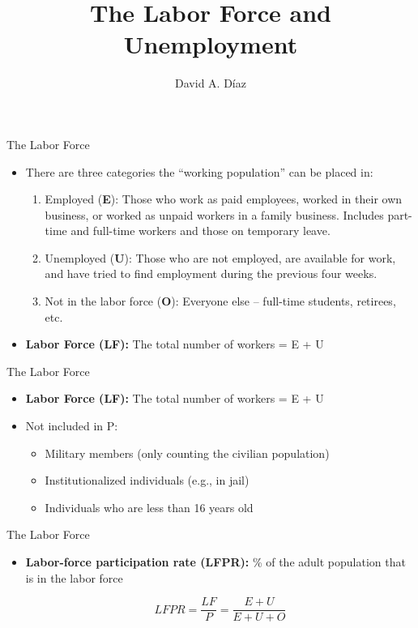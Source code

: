 \documentclass[xcolor={dvipsnames},pdf, hyperref={colorlinks=true, citecolor=ForestGreen, linkcolor=BlueViolet, urlcolor=Magenta}]{beamer}
\title{The Labor Force and Unemployment}
\author{David A. D\'iaz}
\institute{UNC Chapel Hill}
\date{}
\theoremstyle{definition}
\newcommand{\defn}[1]{\textbf{#1}}
\begin{document}
 
	
	\begin{frame}
		
		\titlepage
		
	\end{frame}


\begin{frame}{The Labor Force}
	\begin{itemize}
	\item There are three categories the ``working population'' can be placed in:
	
	\begin{enumerate}
		\item Employed (\textbf{E}): Those who work as paid employees, worked in their own business, or worked as unpaid workers in a family business. Includes part-time and full-time workers and those on temporary leave.
		\item Unemployed (\textbf{U}): Those who are not employed, are available for work, and have tried to find employment during the previous four weeks.
		\item Not in the labor force (\textbf{O}): Everyone else -- full-time students, retirees, etc.
	\end{enumerate}
	
	\item \defn{Labor Force (LF):} The total number of workers = E + U
	


\end{itemize}
\end{frame}

\begin{frame}{The Labor Force}
\begin{itemize}


	\item \defn{Labor Force (LF):} The total number of workers = E + U
	
	\item Not included in P:
	\begin{itemize}
		\item Military members (only counting the civilian population)
		\item Institutionalized individuals (e.g., in jail)
		\item Individuals who are less than 16 years old
	\end{itemize}
\end{itemize}
\end{frame}

\begin{frame}{The Labor Force}
\begin{itemize}
	\item \defn{Labor-force participation rate (LFPR):} \% of the adult population that is in the labor force 
	
	\[LFPR = \frac{LF}{P} = \frac{E + U}{E + U + O}\]
	
\end{itemize}
\end{frame}
\end{document}
